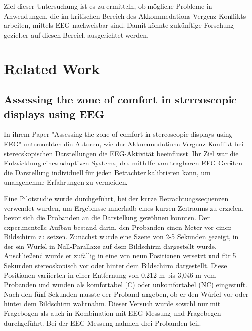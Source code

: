 \documentclass[conference]{IEEEtran}
\begin{document}
Ziel dieser Untersuchung ist es zu ermitteln, ob mögliche Probleme in Anwendungen, die im kritischen Bereich des Akkommodations-Vergenz-Konflikts arbeiten, mittels EEG nachweisbar sind. Damit könnte zukünftige Forschung gezielter auf diesen Bereich ausgerichtet werden.

\section{Related Work}
\subsection{Assessing the zone of comfort in stereoscopic displays using EEG}
In ihrem Paper "Assessing the zone of comfort in stereoscopic displays using EEG" \cite{b1} untersuchten die Autoren, wie der Akkommodations-Vergenz-Konflikt bei stereoskopischen Darstellungen die EEG-Aktivität beeinflusst. Ihr Ziel war die Entwicklung eines adaptiven Systems, das mithilfe von tragbaren EEG-Geräten die Darstellung individuell für jeden Betrachter kalibrieren kann, um unangenehme Erfahrungen zu vermeiden.

Eine Pilotstudie wurde durchgeführt, bei der kurze Betrachtungssequenzen verwendet wurden, um Ergebnisse innerhalb eines kurzen Zeitraums zu erzielen, bevor sich die Probanden an die Darstellung gewöhnen konnten. Der experimentelle Aufbau bestand darin, den Probanden einen Meter vor einen Bildschirm zu setzen. Zunächst wurde eine Szene von 2-5 Sekunden gezeigt, in der ein Würfel in Null-Parallaxe auf dem Bildschirm dargestellt wurde. Anschließend wurde er zufällig in eine von neun Positionen versetzt und für 5 Sekunden stereoskopisch vor oder hinter dem Bildschirm dargestellt. Diese Positionen variierten in einer Entfernung von 0,212 m bis 3,046 m vom Probanden und wurden als komfortabel (C) oder unkomfortabel (NC) eingestuft. Nach den fünf Sekunden musste der Proband angeben, ob er den Würfel vor oder hinter dem Bildschirm wahrnahm. Dieser Versuch wurde sowohl nur mit Fragebogen als auch in Kombination mit EEG-Messung und Fragebogen durchgeführt. Bei der EEG-Messung nahmen drei Probanden teil.
 
\end{document}
